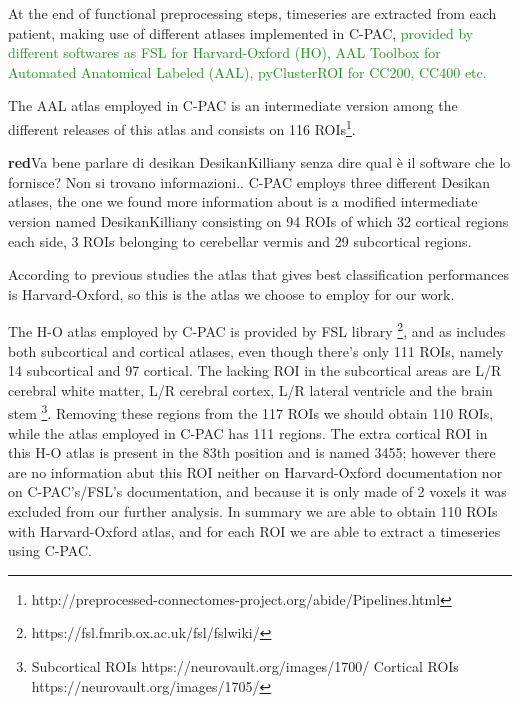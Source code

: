 \documentclass[11pt]{report}
\begin{document}
\hfill

At the end of functional preprocessing steps, timeseries are extracted from each patient, making use of different atlases implemented in C-PAC, \textcolor{ForestGreen}{provided by different softwares as FSL for Harvard-Oxford (HO), AAL Toolbox for Automated Anatomical Labeled (AAL), pyClusterROI for CC200, CC400 etc.}

The AAL atlas employed in C-PAC is an intermediate version among the different releases of this atlas and consists on 116 ROIs\footnote{http://preprocessed-connectomes-project.org/abide/Pipelines.html}.

\textbf{red}{Va bene parlare di desikan DesikanKilliany senza dire qual è il software che lo fornisce? Non si trovano informazioni..}
C-PAC employs three different Desikan atlases, the one we found more information about is a modified intermediate version named DesikanKilliany consisting on 94 ROIs of which 32 cortical regions each side, 3 ROIs belonging to cerebellar vermis and 29 subcortical regions.

According to previous studies \cite{spera-2019} the atlas that gives best classification performances is Harvard-Oxford, so this is the atlas we choose to employ for our work.

The H-O atlas employed by C-PAC is provided by FSL library \footnote{https://fsl.fmrib.ox.ac.uk/fsl/fslwiki/}, and as includes both subcortical and cortical atlases, even though there's only 111 ROIs, namely 14 subcortical and 97 cortical.
The lacking ROI in the subcortical areas are L/R cerebral white matter, L/R cerebral cortex, L/R lateral ventricle and the brain stem \footnote{Subcortical ROIs https://neurovault.org/images/1700/ \quad Cortical ROIs https://neurovault.org/images/1705/ }.
Removing these regions from the 117 ROIs we should obtain 110 ROIs, while the atlas employed in C-PAC has 111 regions.
The extra cortical ROI in this H-O atlas is present in the 83th position and is named 3455; however there are no information abut this ROI neither on Harvard-Oxford documentation nor on C-PAC's/FSL's documentation, and because it is only made of 2 voxels it was excluded from our further analysis.
In summary we are able to obtain 110 ROIs with Harvard-Oxford atlas, and for each ROI we are able to extract a timeseries using C-PAC.
\end{document}
